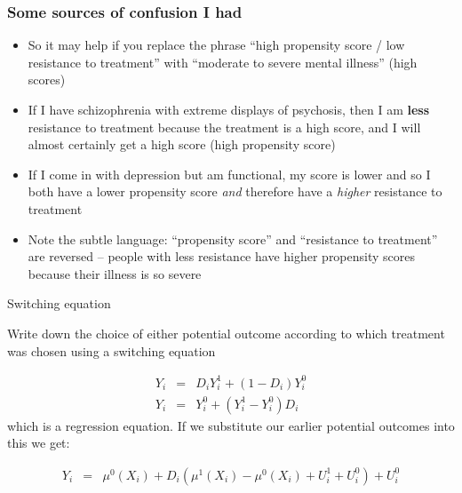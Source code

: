 \documentclass{beamer}
\begin{document}
\begin{frame}
  \frametitle{Some sources of confusion I had}

  \begin{itemize}
    \item So it may help if you replace the phrase ``high propensity score / low resistance to treatment'' with ``moderate to severe mental illness'' (high scores)
    \item If I have schizophrenia with extreme displays of psychosis, then I am \textbf{less} resistance to treatment because the treatment is a high score, and I will almost certainly get a high score (high propensity score)
    \item If I come in with depression but am functional, my score is lower and so I both have a lower propensity score \emph{and} therefore have a \emph{higher} resistance to treatment
    \item Note the subtle language: ``propensity score'' and ``resistance to treatment'' are reversed -- people with less resistance have higher propensity scores because their illness is so severe
  \end{itemize}

\end{frame}



\begin{frame}{Switching equation}

  Write down the choice of either potential outcome according to which treatment was chosen using a switching equation

  \begin{eqnarray*}
    Y_i &=& D_iY_i^1 + (1-D_i)Y_i^0 \\
    Y_i &=& Y_i^0 + (Y_i^1 - Y_i^0)D_i
  \end{eqnarray*}which is a regression equation.  If we substitute our earlier potential outcomes into this we get:

  \begin{eqnarray*}
    Y_i &=& \mu^0(X_i) + D_i(\mu^1(X_i) - \mu^0(X_i) + U_i^1 + U_i^0) + U_i^0
  \end{eqnarray*}

\end{frame}
\end{document}
